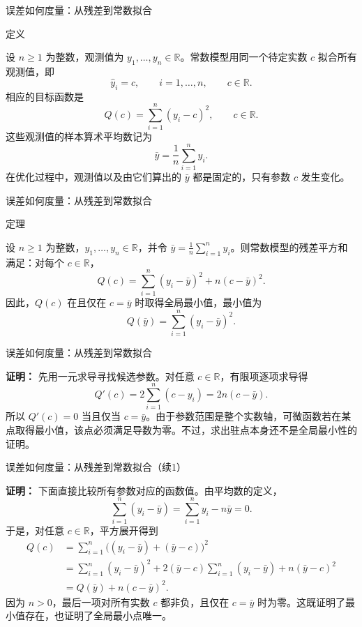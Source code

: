 \documentclass[aspectratio=169,10pt,fontset=fandol]{ctexbeamer}
\begin{document}
\begin{frame}[t,fragile]{误差如何度量：从残差到常数拟合}
\footnotesize
\begin{block}{定义}
{\footnotesize
设 $n\geq1$ 为整数，观测值为 $y_1,\ldots,y_n\in\mathbb{R}$。常数模型用同一个待定实数 $c$ 拟合所有观测值，即
\[
\hat{y}_i=c,\qquad i=1,\ldots,n,\qquad c\in\mathbb{R}.
\]
相应的目标函数是
\[
Q(c)=\sum_{i=1}^{n}(y_i-c)^2,\qquad c\in\mathbb{R}.
\]
这些观测值的样本算术平均数记为
\[
\bar{y}=\frac{1}{n}\sum_{i=1}^{n}y_i.
\]
在优化过程中，观测值以及由它们算出的 $\bar{y}$ 都是固定的，只有参数 $c$ 发生变化。

}
\end{block}
\end{frame}
\begin{frame}[t,fragile]{误差如何度量：从残差到常数拟合}
\footnotesize
\begin{block}{定理}
{\footnotesize
设 $n\geq1$ 为整数，$y_1,\ldots,y_n\in\mathbb{R}$，并令 $\bar{y}=\frac{1}{n}\sum_{i=1}^{n}y_i$。则常数模型的残差平方和满足：对每个 $c\in\mathbb{R}$，
\[
Q(c)=\sum_{i=1}^{n}(y_i-\bar{y})^2+n(c-\bar{y})^2.
\]
因此，$Q(c)$ 在且仅在 $c=\bar{y}$ 时取得全局最小值，最小值为
\[
Q(\bar{y})=\sum_{i=1}^{n}(y_i-\bar{y})^2.
\]

}
\end{block}
\end{frame}
\begin{frame}[t,fragile]{误差如何度量：从残差到常数拟合}
\footnotesize
{\footnotesize
\textbf{证明：}
先用一元求导寻找候选参数。对任意 $c\in\mathbb{R}$，有限项逐项求导得
\[
Q'(c)=2\sum_{i=1}^{n}(c-y_i)=2n(c-\bar{y}).
\]
所以 $Q'(c)=0$ 当且仅当 $c=\bar{y}$。由于参数范围是整个实数轴，可微函数若在某点取得最小值，该点必须满足导数为零。不过，求出驻点本身还不是全局最小性的证明。


}
\end{frame}
\begin{frame}[t,fragile]{误差如何度量：从残差到常数拟合（续1）}
\footnotesize
{\footnotesize
\textbf{证明：}
下面直接比较所有参数对应的函数值。由平均数的定义，
\[
\sum_{i=1}^{n}(y_i-\bar{y})=\sum_{i=1}^{n}y_i-n\bar{y}=0.
\]
于是，对任意 $c\in\mathbb{R}$，平方展开得到
\[
\begin{aligned}
Q(c)&=\sum_{i=1}^{n}\bigl((y_i-\bar{y})+(\bar{y}-c)\bigr)^2\\
&=\sum_{i=1}^{n}(y_i-\bar{y})^2
 +2(\bar{y}-c)\sum_{i=1}^{n}(y_i-\bar{y})
 +n(\bar{y}-c)^2\\
&=Q(\bar{y})+n(c-\bar{y})^2.
\end{aligned}
\]
因为 $n>0$，最后一项对所有实数 $c$ 都非负，且仅在 $c=\bar{y}$ 时为零。这既证明了最小值存在，也证明了全局最小点唯一。

}
\end{frame}
\end{document}
